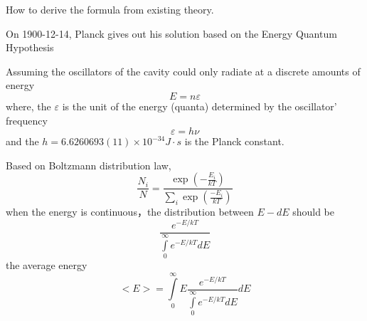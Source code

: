 \begin{frame}
    \begin{tcolorbox}[colback=yellow!5,colframe=yellow!75!black,title=The problem]
        How to derive the formula from existing theory.
    \end{tcolorbox}
    \begin{tcolorbox}[colback=yellow!10,colframe=red!75!black,title=Solution]
        On 1900-12-14, Planck gives out his solution based on the Energy Quantum Hypothesis  
    \end{tcolorbox}
\end{frame}

\begin{frame}
    \begin{tcolorbox}[colback=yellow!10,colframe=red!75!black,title=Energy quantum hypothesis]
    Assuming the oscillators of the cavity could only radiate at a discrete amounts of energy
    \begin{equation}
        E=n\varepsilon
    \end{equation}
    where, the $\varepsilon$ is the unit of the energy (quanta) determined by the oscillator' frequency 
    \begin{equation}
        \varepsilon=h\nu
    \end{equation}
    and the $h=6.6260693(11)×10^{-34} J\cdot s $ is the Planck constant. 
    \end{tcolorbox}
\end{frame}

\begin{frame}
    Based on Boltzmann distribution law,
    \begin{equation*}
        \frac{N_{i}}{N}=\frac{\exp \left(-\frac{E_{i}}{k T}\right)}{\sum_{i} \exp \left(\frac{-E_{i}}{k T}\right)}
    \end{equation*}
    \bullet when the energy is continuous，the distribution between $E - dE$ should be 
    \begin{equation*}
        \frac{e^{-E / k T}}{\int\limits_{0}^{\infty} e^{-E / k T} d E}
    \end{equation*}  
    the average energy 
    \begin{equation*}
        <E>=\int\limits_{0}^{\infty} E \frac{e^{-E / k T}}{\int\limits_{0}^{\infty} e^{-E / k T} d E} d E
    \end{equation*}
\end{frame}

